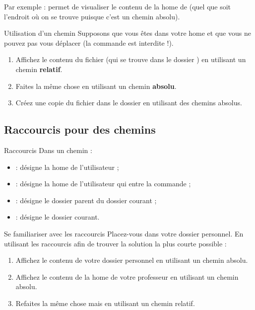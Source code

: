 \documentclass[a4paper,11pt]{style-esi/td}
\begin{document}
		Par exemple : 
		permet de visualiser le contenu de la home de 
		(quel que soit l'endroit où on se trouve puisque c'est un chemin absolu).
		
		\begin{Exercice}{Utilisation d'un chemin}
			Supposons que vous êtes dans votre home 
			et que vous ne pouvez pas vous déplacer 
			(la commande  est interdite !).
			\begin{enumerate}
			\item 
				Affichez le contenu du fichier 
				(qui se trouve dans le dossier )
				en utilisant un chemin \textbf{relatif}.
			\item 
				Faites la même chose 
				en utilisant un chemin \textbf{absolu}.
			\item
				Créez une copie du fichier  
				dans le dossier 
				en utilisant des chemins absolus.
			\end{enumerate}
		\end{Exercice}

	\subsection{Raccourcis pour des chemins}

		\begin{theorie}{Raccourcis}
			Dans un chemin :
			\begin{itemize}
			\item {} : désigne la home de l'utilisateur  ;
			\item \samp{\textasciitilde{}} : désigne la home de l'utilisateur qui entre la commande ;
			\item {} : désigne le dossier parent du dossier courant ;
			\item {} : désigne le dossier courant.
			\end{itemize}
		\end{theorie}

		\begin{Exercice}{Se familiariser avec les raccourcis}
			Placez-vous dans votre dossier personnel.
			En utilisant les raccourcis 
			afin de trouver la solution la plus courte possible :
			\begin{enumerate}
			\item Affichez le contenu de votre dossier personnel
				en utilisant un chemin absolu.
			\item Affichez le contenu de la home de votre professeur
				en utilisant un chemin absolu.
			\item Refaites la même chose mais en utilisant un chemin relatif.
			\end{enumerate}
		\end{Exercice}
\end{document}
